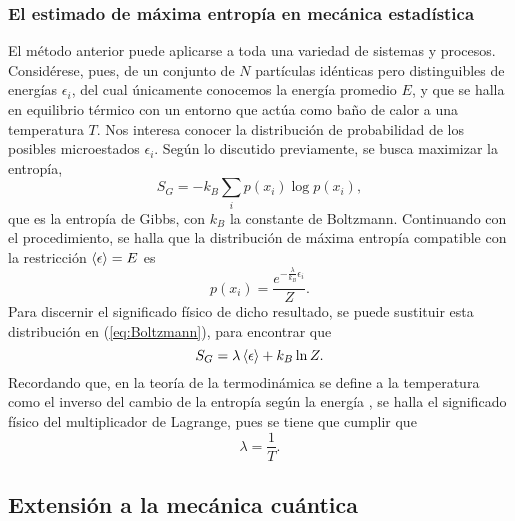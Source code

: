 \subsubsection{El estimado de máxima entropía en mecánica estadística}

El método anterior puede aplicarse a toda una variedad de sistemas y procesos. Considérese, pues, de un conjunto de $N$ partículas idénticas pero distinguibles de energías $\epsilon_{i}$, del cual únicamente conocemos la energía promedio $E$, y que se halla en equilibrio térmico con un entorno que actúa como baño de calor a una temperatura $T$. Nos interesa conocer la distribución de probabilidad de los posibles microestados $\epsilon_{i}$. Según lo discutido previamente, se busca maximizar la entropía,
\begin{equation}\label{eq:GibbsEntropy}
    S_{G}=-k_{B}\sum_{i}p(x_{i})\log{p(x_{i})},
\end{equation}
que es la entropía de Gibbs, con $k_{B}$ la constante de Boltzmann. Continuando con el procedimiento, se halla que la distribución de máxima entropía compatible con la restricción $\expval{\epsilon}=E$ es
\begin{equation}\label{eq:Boltzmann}
    p(x_{i})=\frac{e^{-\frac{\lambda}{k_{B}}\epsilon_{i}}}{Z}.
\end{equation}
Para discernir el significado físico de dicho resultado, se puede sustituir esta distribución en (\ref{eq:Boltzmann}), para encontrar que
\begin{equation}
    S_{G}=\lambda\expval{\epsilon}+k_{B}\ln{Z}.
\end{equation}
Recordando que, en la teoría de la termodinámica se define a la temperatura como el inverso del cambio de la entropía según la energía \cite{Greiner}, se halla el significado físico del multiplicador de Lagrange, pues se tiene que cumplir que
\begin{equation*}
    \lambda=\frac{1}{T}.
\end{equation*}

\subsection{Extensión a la mecánica cuántica}

